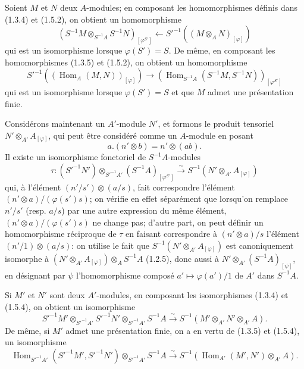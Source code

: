 \begin{env}[1.5.3]
\label{0.1.5.3-fr}
Soient $M$ et $N$ deux $A$-modules; en composant les homomorphismes définis dans (1.3.4) et (1.5.2), on obtient un homomorphisme
\[
  (S^{-1}M\otimes_{S^{-1}A}S^{-1}N)_{[\varphi^{S'}]}
  \longleftarrow
  S'^{-1}((M\otimes_A N)_{[\varphi]})
\]
qui est un isomorphisme lorsque $\varphi(S')=S$.
De même, en composant les homomorphismes (1.3.5) et (1.5.2), on obtient un homomorphisme
\[
  S'^{-1}((\operatorname{Hom}_A(M,N))_{[\varphi]})
  \longrightarrow
  (\operatorname{Hom}_{S^{-1}A}(S^{-1}M,S^{-1}N))_{[\varphi^{S'}]}
\]
qui est un isomorphisme lorsque $\varphi(S')=S$ et que $M$ admet une présentation finie.
\end{env}

\begin{env}[1.5.4]
\label{0.1.5.4-fr}
Considérons maintenant un $A'$-module $N'$, et formons le produit tensoriel $N'\otimes_{A'}A_{[\varphi]}$, qui peut être considéré comme un $A$-module en posant
\[
  a.(n'\otimes b)=n'\otimes(ab).
\]
Il existe un isomorphisme fonctoriel de $S^{-1}A$-modules
\[
  \tau:(S'^{-1}N')\otimes_{S'^{-1}A'}(S^{-1}A)_{[\varphi^{S'}]}
  \xrightarrow{\sim}
  S^{-1}(N'\otimes_{A'}A_{[\varphi]})
\]
qui, à l'élément $(n'/s')\otimes(a/s)$, fait correspondre l'élément
$(n'\otimes a)/(\varphi(s')s)$; on vérifie en effet séparément que lorsqu'on
remplace $n'/s'$ (resp. $a/s$) par une autre expression du même élément,
$(n'\otimes a)/(\varphi(s')s)$ ne change pas; d'autre part, on peut définir un
homomorphisme réciproque de $\tau$ en faisant correspondre à $(n'\otimes a)/s$
l'élément $(n'/1)\otimes(a/s)$: on utilise le fait que
$S^{-1}(N'\otimes_{A'}A_{[\varphi]})$ est canoniquement isomorphe à
$(N'\otimes_{A'}A_{[\varphi]})\otimes_A S^{-1}A$ (1.2.5), donc aussi à
$N'\otimes_{A'}(S^{-1}A)_{[\psi]}$, en désignant par $\psi$ l'homomorphisme
composé $a'\mapsto\varphi(a')/1$ de $A'$ dans $S^{-1}A$.
\end{env}

\begin{env}[1.5.5]
\label{0.1.5.5-fr}
Si $M'$ et $N'$ sont deux $A'$-modules, en composant les isomorphismes (1.3.4)
et (1.5.4), on obtient un isomorphisme
\[
  S'^{-1}M'\otimes_{S'^{-1}A'}S'^{-1}N'
  \otimes_{S'^{-1}A'}S^{-1}A
  \xrightarrow{\sim}
  S^{-1}(M'\otimes_{A'}N'\otimes_{A'}A).
\]
De même, si $M'$ admet une présentation finie, on a en vertu de (1.3.5) et
(1.5.4), un isomorphisme
\[
  \operatorname{Hom}_{S'^{-1}A'}(S'^{-1}M',S'^{-1}N')
  \otimes_{S'^{-1}A'}S^{-1}A
  \xrightarrow{\sim}
  S^{-1}(\operatorname{Hom}_{A'}(M',N')\otimes_{A'}A).
\]
\end{env}


